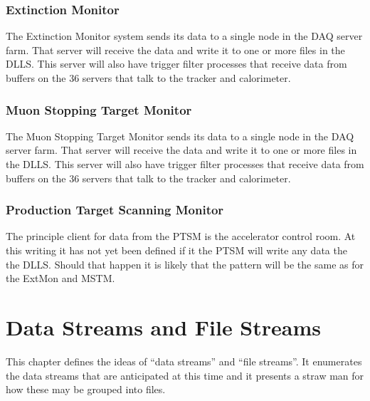 
\subsection{Extinction Monitor}
\label{ssec:ExtMon}

The Extinction Monitor system sends its data to a single node in the DAQ server farm.
That server will receive the data and write it to one or more files in
the DLLS.  This server will also have trigger filter processes that receive
data from buffers on the 36 servers that talk to the tracker and calorimeter.


\subsection{Muon Stopping Target Monitor}
\label{ssec:MSTM}

The Muon Stopping Target Monitor sends its data to a single node in the DAQ server farm.
That server will receive the data and write it to one or more files in
the DLLS.  This server will also have trigger filter processes that receive
data from buffers on the 36 servers that talk to the tracker and calorimeter.

\subsection{Production Target Scanning Monitor}

The principle client for data from the PTSM is the accelerator control room.
At this writing it has not yet been defined if it the PTSM will write any data the the DLLS.
Should that happen it is likely that the pattern will be the same as for the ExtMon
and MSTM.


\chapter{Data Streams and File Streams}
\label{ch:DataStreamsAndFileStreams}

This chapter defines the ideas of ``data streams'' and ``file streams''.
It enumerates the data streams that are anticipated at this time
and it presents a straw man for how these may be grouped into files.

